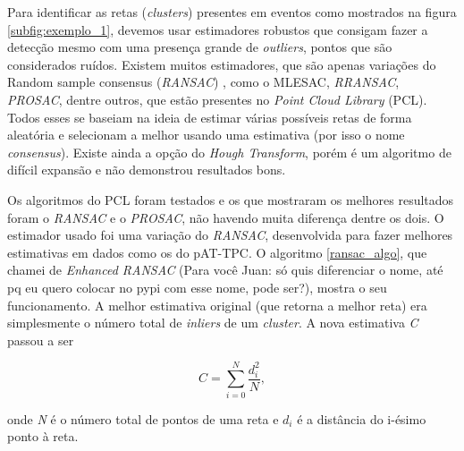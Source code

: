 \documentclass[a4paper,12pt,oneside]{book}
\begin{document}

\par Para identificar as retas (\textit{clusters}) presentes em eventos como mostrados na figura \ref{subfig:exemplo_1}, devemos usar estimadores robustos que consigam fazer a detecção mesmo com uma presença grande de \textit{outliers}, pontos que são considerados ruídos. Existem muitos estimadores, que são apenas variações do  Random sample consensus (\textit{RANSAC}) \cite{ransac}, como o MLESAC\cite{ref:MLESAC}, \textit{RRANSAC}, \textit{PROSAC}, dentre outros, que estão presentes no \textit{Point Cloud Library} (PCL)\cite{pcl}. Todos esses se baseiam na ideia de estimar várias possíveis retas de forma aleatória e selecionam a melhor usando uma estimativa (por isso o nome \textit{consensus}). Existe ainda a opção do \textit{Hough Transform}\cite{hough}, porém é um algoritmo de difícil expansão e não demonstrou resultados bons.


\par Os algoritmos do PCL foram testados e os que mostraram os melhores resultados foram o \textit{RANSAC} e o \textit{PROSAC}, não havendo muita diferença dentre os dois. O estimador usado foi uma variação do \textit{RANSAC}, desenvolvida para fazer melhores estimativas em dados como os do pAT-TPC\cite{artigo}. O algoritmo \ref{ransac_algo}, que chamei de \textit{Enhanced RANSAC} (Para você Juan: só quis diferenciar o nome, até pq eu quero colocar no pypi com esse nome, pode ser?), mostra o seu funcionamento. A melhor estimativa original (que retorna a melhor reta) era simplesmente o número total de \textit{inliers} de um \textit{cluster}. A nova estimativa \textit{C} passou a ser

\begin{equation} \label{criterio_ransac}
    C = \sum_{i = 0}^{N} \frac{d_i ^2}{N},
\end{equation}

onde \textit{N} é o número total de pontos de uma reta e $d_i$ é a distância do i-ésimo ponto à reta.
\end{document}

